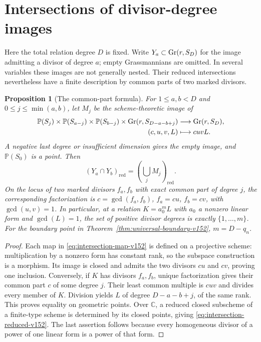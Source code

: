 \documentclass[11pt,reqno]{amsart}
\numberwithin{equation}{section}
\newtheorem{proposition}[theorem]{Proposition}
\theoremstyle{definition}\newtheorem{definition}[theorem]{Definition}
\theoremstyle{remark}\newtheorem{remark}[theorem]{Remark}
\newcommand{\C}{\mathbb C}\newcommand{\Q}{\mathbb Q}
\newcommand{\Pj}{\mathbb P}\newcommand{\A}{\mathbb A}
\begin{document}
\section{Intersections of divisor-degree images}
\label{sec:degree-intersections-v152}

Here the total relation degree $D$ is fixed.  Write $Y_a\subset
\operatorname{Gr}(r,S_D)$ for the image admitting a divisor of degree $a$;
empty Grassmannians are omitted.  In several variables these images
are not generally nested.  Their reduced intersections nevertheless
have a finite description by common parts of two marked divisors.

\begin{proposition}[The common-part formula]
\label{prop:degree-intersections-v152}
For $1\leq a,b<D$ and $0\leq j\leq\min(a,b)$, let $M_j$ be the
scheme-theoretic image of
\begin{equation}\label{eq:intersection-map-v152}
\begin{split}
 \Pj(S_j)\times\Pj(S_{a-j})\times\Pj(S_{b-j})
       \times\Gr(r,S_{D-a-b+j})&\longrightarrow\Gr(r,S_D),\\
                   (c,u,v,L)&\longmapsto cuvL.
\end{split}
\end{equation}
A negative last degree or insufficient dimension gives the empty
image, and $\Pj(S_0)$ is a point.  Then
\begin{equation}\label{eq:intersection-reduced-v152}
             (Y_a\cap Y_b)_{\mathrm{red}}
                         =\left(\bigcup_j M_j\right)_{\mathrm{red}}.
\end{equation}
On the locus of two marked divisors $f_a,f_b$ with exact common
part of degree $j$, the corresponding factorization is
$c=\gcd(f_a,f_b)$, $f_a=cu$, $f_b=cv$, with $\gcd(u,v)=1$.
In particular, at a relation $K=a_0^mL$ with $a_0$ a nonzero
linear form and $\gcd(L)=1$, the
set of positive divisor degrees is exactly $\{1,\ldots,m\}$.
For the boundary point in Theorem~\ref{thm:universal-boundary-v152},
$m=D-q_n$.
\end{proposition}
\begin{proof}
Each map in \eqref{eq:intersection-map-v152} is defined on a
projective scheme: multiplication by a nonzero form has constant
rank, so the subspace construction is a morphism.  Its image is
closed and admits the two divisors $cu$ and $cv$, proving one
inclusion.  Conversely, if $K$ has divisors $f_a,f_b$, unique
factorization gives their common part $c$ of some degree $j$.
Their least common multiple is $cuv$ and divides every member of
$K$.  Division yields $L$ of degree $D-a-b+j$, of the same rank.
This proves equality on geometric points.  Over $\C$, a reduced
closed subscheme of a finite-type scheme is determined by its closed
points, giving \eqref{eq:intersection-reduced-v152}.  The last
assertion follows because every homogeneous divisor of a power
of one linear form is a power of that form.
\end{proof}
\end{document}
